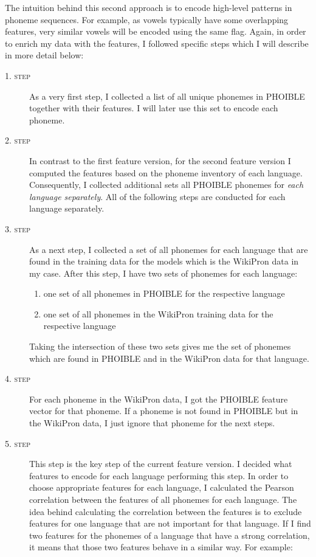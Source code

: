 The intuition behind this second approach is to encode high-level patterns in phoneme sequences. For example, as vowels typically have some overlapping features, very similar vowels will be encoded using the same flag. Again, in order to enrich my data with the features, I followed specific steps which I will describe in more detail below: 

\begin{description}
    \item[\textsc{1. step}] As a very first step, I collected a list of all unique phonemes in PHOIBLE together with their features. I will later use this set to encode each phoneme.
    \item[\textsc{2. step}] In contrast to the first feature version, for the second feature version I computed the features based on the phoneme inventory of each language. Consequently, I collected additional sets all PHOIBLE phonemes for \textit{each language separately}. All of the following steps are conducted for each language separately.
    \item[\textsc{3. step}] As a next step, I collected a set of all phonemes for each language that are found in the training data for the models which is the WikiPron data in my case. 
    After this step, I have two sets of phonemes for each language:
    \begin{enumerate}
    \item one set of all phonemes in PHOIBLE for the respective language
        \item one set of all phonemes in the WikiPron training data for the respective language
    \end{enumerate}
    Taking the intersection of these two sets gives me the set of phonemes which are found in PHOIBLE and in the WikiPron data for that language.
    \item[\textsc{4. step}] For each phoneme in the WikiPron data, I got the PHOIBLE feature vector for that phoneme. If a phoneme is not found in PHOIBLE but in the WikiPron data, I just ignore that phoneme for the next steps.
    \item[\textsc{5. step}] This step is the key step of the current feature version. I decided what features to encode for each language performing this step. In order to choose appropriate features for each language, I calculated the Pearson correlation between the features of all phonemes for each language. The idea behind calculating the correlation between the features is to exclude features for one language that are not important for that language. If I find two features for the phonemes of a language that have a strong correlation, it means that those two features behave in a similar way. For example:
    

\end{description}
